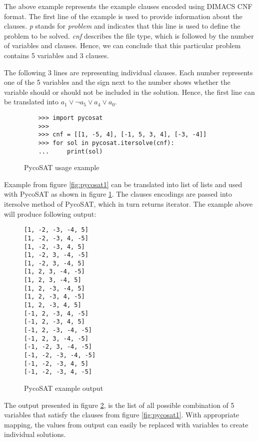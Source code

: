 The above example represents the example clauses encoded using DIMACS CNF format. The first line of the example is used to provide information about the clauses. \textit{p} stands for \textit{problem} and indicates that this line is used to define the problem to be solved. \textit{cnf} describes the file type, which is followed by the number of variables and clauses. Hence, we can conclude that this particular problem contains 5 variables and 3 clauses. 

The following 3 lines are representing individual clauses. Each number represents one of the 5 variables and the sign next to the number shows whether the variable should or should not be included in the solution. Hence, the first line can be translated into $ a_1 \lor \neg a_5 \lor a_4 \lor a_0 $. 

\begin{figure}
\begin{verbatim}
	>>> import pycosat
	>>>
	>>> cnf = [[1, -5, 4], [-1, 5, 3, 4], [-3, -4]]
	>>> for sol in pycosat.itersolve(cnf):
	...	    print(sol)
\end{verbatim}
\caption{PycoSAT usage example}
\label{fig:pycosatUsage}
\end{figure}

Example from figure \ref{fig:pycosat1} can be translated into list of lists and used with PycoSAT as shown in figure \ref{fig:pycosatUsage}. The clauses encodings are passed into itersolve method of PycoSAT, which in turn returns iterator. The example above will produce following output:

\begin{figure}
	\begin{verbatim}
[1, -2, -3, -4, 5]
[1, -2, -3, 4, -5]
[1, -2, -3, 4, 5]
[1, -2, 3, -4, -5]
[1, -2, 3, -4, 5]
[1, 2, 3, -4, -5]
[1, 2, 3, -4, 5]
[1, 2, -3, -4, 5]
[1, 2, -3, 4, -5]
[1, 2, -3, 4, 5]
[-1, 2, -3, 4, -5]
[-1, 2, -3, 4, 5]
[-1, 2, -3, -4, -5]
[-1, 2, 3, -4, -5]
[-1, -2, 3, -4, -5]
[-1, -2, -3, -4, -5]
[-1, -2, -3, 4, 5]
[-1, -2, -3, 4, -5]
	\end{verbatim}
	\caption{PycoSAT example output}
	\label{fig:pycosatOutput}
\end{figure}

The output presented in figure \ref{fig:pycosatOutput}, is the list of all possible combination of 5 variables that satisfy the clauses from figure \ref{fig:pycosat1}. With appropriate mapping, the values from output can easily be replaced with variables to create individual solutions. 



